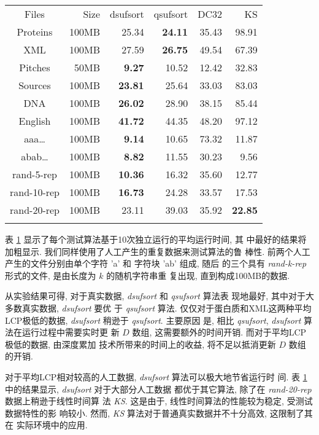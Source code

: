 \documentclass{ws-ijprai}
\begin{document}
\begin{table}
  { \begin{tabular}{crrrrr} \toprule
   Files & Size   & dsufsort  & qsufsort & DC32  & KS\\   \colrule
    Proteins   & 100MB  & 25.34 &\textbf{24.11}    & 35.43 & 98.91\\
    XML        & 100MB  & 27.59 &\textbf{26.75}    & 49.54 & 67.39 \\
    Pitches    & 50MB   &\textbf{9.27 } & 10.52    & 12.42 & 32.83 \\
    Sources    & 100MB  &\textbf{23.81} & 25.64    & 33.03 & 83.03 \\
    DNA        & 100MB  &\textbf{26.02} & 28.90    & 38.15 & 85.44 \\
    English    & 100MB  &\textbf{41.72} & 44.35    & 48.20 & 97.12 \\
    \colrule
    aaa\dots    & 100MB  &\textbf{9.14}  & 10.65 & 73.32 & 11.87\\
    abab\dots   & 100MB  &\textbf{8.82}  & 11.55 & 30.23 & 9.56\\
    rand-5-rep  & 100MB   &\textbf{10.36} & 16.32 & 35.60 & 12.77 \\
    rand-10-rep & 100MB   &\textbf{16.73} & 24.28 & 33.57 & 17.53 \\
    rand-20-rep & 100MB   & 23.11 & 39.03 & 35.92  & \textbf{22.85} \\
    \botrule
  \end{tabular}}
  \label{tab:time}
\end{table}

表 \ref{tab:time} 显示了每个测试算法基于10次独立运行的平均运行时间, 其
中最好的结果将加粗显示. 我们同样使用了人工产生的重复数据来测试算法的鲁
棒性. 前两个人工产生的文件分别由单个字符 'a' 和 字符块 'ab' 组成, 随后
的三个具有 \emph{rand-k-rep} 形式的文件, 是由长度为 $k$ 的随机字符串重
复出现, 直到构成100MB的数据.

从实验结果可得, 对于真实数据, \emph{dsufsort} 和 \emph{qsufsort} 算法表
现地最好, 其中对于大多数真实数据, \emph{dsufsort} 要优
于 \emph{qsufsort} 算法. 仅仅对于蛋白质和XML这两种平均LCP极低的数据,
\emph{dsufsort} 稍逊于 \emph{qsufsort}. 主要原因
是, 相比 \emph{qsufsort}, \emph{dsufsort} 算法在运行过程中需要实时更
新 $D$ 数组, 这需要额外的时间开销. 而对于平均LCP极低的数据, 由深度累加
技术所带来的时间上的收益, 将不足以抵消更新 $D$ 数组的开销.

对于平均LCP相对较高的人工数据, \emph{dsufsort} 算法可以极大地节省运行时
间. 表 \ref{tab:time} 中的结果显示, \emph{dsufsort} 对于大部分人工数据
都优于其它算法, 除了在 \emph{rand-20-rep} 数据上稍逊于线性时间算
法 \emph{KS}. 这是由于, 线性时间算法的性能较为稳定, 受测试数据特性的影
响较小. 然而, \emph{KS} 算法对于普通真实数据并不十分高效, 这限制了其在
实际环境中的应用.
\end{document}
